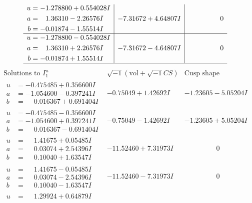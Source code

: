 \documentclass[1p]{elsarticle_modified}
\theoremstyle{definition}
\newcommand{\I}{\sqrt{-1}}
\begin{document}
$$\begin{array}{c|c|c}
\begin{aligned}
u &= -1.278800 + 0.554028 I \\
a &= \phantom{-}1.36310 - 2.26576 I \\
b &= -0.01874 - 1.55514 I\end{aligned}
 & -7.31672 + 4.64807 I & \phantom{-0.000000 } 0 \\ \hline\begin{aligned}
u &= -1.278800 - 0.554028 I \\
a &= \phantom{-}1.36310 + 2.26576 I \\
b &= -0.01874 + 1.55514 I\end{aligned}
 & -7.31672 - 4.64807 I & \phantom{-0.000000 } 0\\
 \hline 
 \end{array}$$\newpage$$\begin{array}{c|c|c}  
\text{Solutions to }I^u_{1}& \I (\text{vol} + \sqrt{-1}CS) & \text{Cusp shape}\\
 \hline 
\begin{aligned}
u &= -0.475485 + 0.356600 I \\
a &= -1.054600 - 0.397241 I \\
b &= \phantom{-}0.016367 + 0.691404 I\end{aligned}
 & -0.75049 + 1.42692 I & -1.23605 - 5.05204 I \\ \hline\begin{aligned}
u &= -0.475485 - 0.356600 I \\
a &= -1.054600 + 0.397241 I \\
b &= \phantom{-}0.016367 - 0.691404 I\end{aligned}
 & -0.75049 - 1.42692 I & -1.23605 + 5.05204 I \\ \hline\begin{aligned}
u &= \phantom{-}1.41675 + 0.05485 I \\
a &= \phantom{-}0.03074 + 2.54396 I \\
b &= \phantom{-}0.10040 + 1.63547 I\end{aligned}
 & -11.52460 + 7.31973 I & \phantom{-0.000000 } 0 \\ \hline\begin{aligned}
u &= \phantom{-}1.41675 - 0.05485 I \\
a &= \phantom{-}0.03074 - 2.54396 I \\
b &= \phantom{-}0.10040 - 1.63547 I\end{aligned}
 & -11.52460 - 7.31973 I & \phantom{-0.000000 } 0 \\ \hline\begin{aligned}
u &= \phantom{-}1.29924 + 0.64879 I \\

\end{aligned}
\end{array}$$
\end{document}
